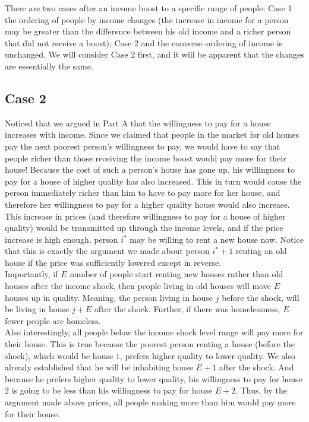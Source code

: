 \documentclass[12pt]{paper}
\begin{document}
There are two cases after an income boost to a specific range of people: Case 1 the ordering of people by income changes (the increase in income for a person may be greater than the difference between his old income and a richer person that did not receive a boost); Case 2 and the converse--ordering of income is unchanged. We will consider Case 2 first, and it will be apparent that the changes are essentially the same.


\subsection*{Case 2}


Noticed that we argued in Part A that the willingness to pay for a house increases with income. Since we claimed that people in the market for old homes pay the next poorest person's willingness to pay, we would have to say that people richer than those receiving the income boost would pay more for their house! Because the cost of such a person's house has gone up, his willingness to pay for a house of higher quality has also increased. This in turn would cause the person immediately richer than him to have to pay more for her house, and therefore her willingness to pay for a higher quality house would also increase. This increase in prices (and therefore willingness to pay for a house of higher quality) would be transmitted up through the income levels, and if the price increase is high enough, person $i^*$ may be willing to rent a new house now. Notice that this is exactly the argument we made about person $i^*+1$ renting an old house if the price was sufficiently lowered except in reverse.\\


Importantly, if $E$ number of people start renting new houses rather than old houses after the income shock, then people living in old houses will move $E$ houses up in quality. Meaning, the person living in house $j$ before the shock, will be living in house $j+E$ after the shock. Further, if there was homelessness, $E$ fewer people are homeless.\\


Also interestingly, all people below the income shock level range will pay more for their house. This is true because the poorest person renting a house (before the shock), which would be house $1$, prefers higher quality to lower quality. We also already established that he will be inhabiting house $E+1$ after the shock. And because he prefers higher quality to lower quality, his willingness to pay for house $2$ is going to be less than his willingness to pay for house $E+2$. Thus, by the argument made above prices, all people making more than him would pay more for their house.\\
\end{document}
